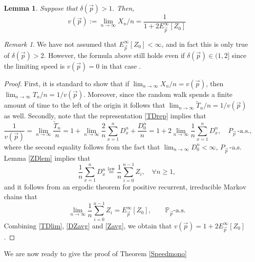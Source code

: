 \documentclass[reqno,letterpaper,11pt]{amsart}
\newtheorem{lem}[thm]{Lemma}
\theoremstyle{remark}
\newtheorem{rem}[thm]{Remark}
\theoremstyle{definition}
\begin{document}
\begin{lem}\label{vform}
 Suppose that ${\delta}({\vec{p}}) > 1$. Then, 
\[
 v({\vec{p}}) := \lim_{n{\rightarrow}\infty} X_n/n = \frac{1}{1 + 2 E_{\vec{p}}^\infty[ Z_0 ]}
\]
\end{lem}
\begin{rem}
 We have not assumed that $E_{\vec{p}}^\infty[ Z_0 ] < \infty$, and in fact this is only true of ${\delta}({\vec{p}}) > 2$. However, the formula above still holds even if ${\delta}({\vec{p}}) \in (1,2]$ since the limiting speed is $v({\vec{p}}) = 0$ in that case \cite{bsCRWspeed,kzPNERW}. 
\end{rem}

\begin{proof}
 First, it is standard to show that if $\lim_{n{\rightarrow}\infty} X_n/n = v({\vec{p}})$, then $\lim_{n{\rightarrow}\infty} T_n/n = 1/v({\vec{p}})$. 
Moreover, since the random walk spends a finite amount of time to the left of the origin it follows that $\lim_{n{\rightarrow}\infty} \widetilde{T}_n/n = 1/v({\vec{p}})$ as well. 
Secondly, note that the representation \eqref{TDrep} implies that 
\begin{equation}\label{TDlim}
\frac{1}{v({\vec{p}})} =
\lim_{n{\rightarrow}\infty} \frac{\widetilde{T}_n}{n} 
= 1 + \lim_{n{\rightarrow}\infty} \frac{2}{n} \sum_{x=1}^n D_x^n + \frac{D_0^n}{n}
= 1 + 2 \lim_{n{\rightarrow}\infty} \frac{1}{n} \sum_{x=1}^n D_x^n , \quad P_{\vec{p}}\,\text{-a.s.},
\end{equation}
where the second equality follows from the fact that $\lim_{n{\rightarrow}\infty} D_0^n < \infty$, $P_{\vec{p}}$\,-a.s. Lemma \ref{ZDlem} implies that 
\begin{equation}\label{DZavg}
 \frac{1}{n} \sum_{x=1}^n D_x^n \overset{\text{law}}{=} \frac{1}{n} \sum_{i=0}^{n-1} Z_i, \quad \forall n\geq 1,
\end{equation}
and it follows from an ergodic theorem for positive recurrent, irreducible Markov chains that 
\begin{equation}\label{Zavg}
 \lim_{n{\rightarrow}\infty} \frac{1}{n} \sum_{i=0}^{n-1} Z_i = E_{\vec{p}}^\infty[ Z_0 ], \qquad {\mathbb{P}}_{\vec{p}}\text{-a.s.} 
\end{equation}
Combining \eqref{TDlim}, \eqref{DZavg} and \eqref{Zavg}, we obtain that $v({\vec{p}}) = 1 +  2 E_{\vec{p}}^\infty[ Z_0 ]$. 
\end{proof}

We are now ready to give the proof of Theorem \ref{Speedmono}
\end{document}
